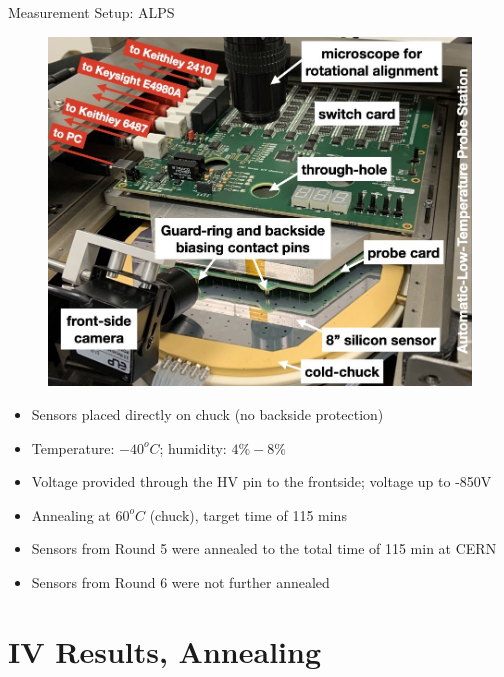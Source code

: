 \documentclass{beamer}
\begin{document}
\begin{frame}{Measurement Setup: ALPS}
    \begin{figure}
        \includegraphics[width=.45\textwidth]{plots/ALPS_setup.png}
    \end{figure}
  
    \begin{itemize}
        \scriptsize
        \item Sensors placed directly on chuck (no backside protection)
        \item Temperature: $-40^oC$; humidity: $ 4\% - 8\%$
        \item Voltage provided through the HV pin to the frontside;  voltage up to \alert{-850V}
        \item Annealing at $60^oC$ (chuck), target time of 115 mins
        \item Sensors from Round 5 were annealed to the total time of 115 min at CERN 
        \item Sensors from Round 6 were not further annealed
    \end{itemize}
\end{frame}
  

\section{IV Results, Annealing}
\end{document}
